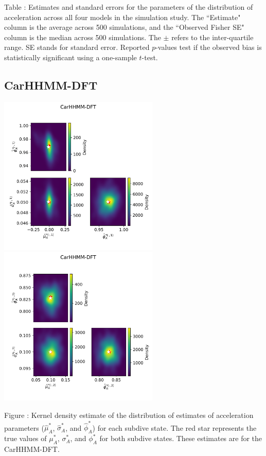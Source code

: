 \documentclass{article}
\begin{document}
        \noindent Table : Estimates and standard errors for the parameters of the distribution of acceleration across all four models in the simulation study. The ``Estimate" column is the average across 500 simulations, and the ``Observed Fisher SE" column is the median across 500 simulations. The $\pm$ refers to the inter-quartile range. SE stands for standard error. Reported $p$-values test if the observed bias is statistically significant using a one-sample $t$-test.
        \addtocounter{tablenum}{1}
    
        \subsection{CarHHMM-DFT}
        \begin{center}
        \includegraphics[width=3in]{../Plots/hhmm_FV_MLE_density_A_0_0.png}
        \includegraphics[width=3in]{../Plots/hhmm_FV_MLE_density_A_0_1.png}
        \end{center}
        
        \noindent Figure : Kernel density estimate of the distribution of estimates of acceleration parameters ($\hat \mu^*_A$, $\hat \sigma^*_A$, and $\hat \phi^*_A$) for each subdive state. The red star represents the true values of $\mu^*_A$, $\sigma^*_A$, and $\phi^*_A$ for both subdive states. These estimates are for the CarHHMM-DFT.
        \addtocounter{fignum}{1}
        
\end{document}
